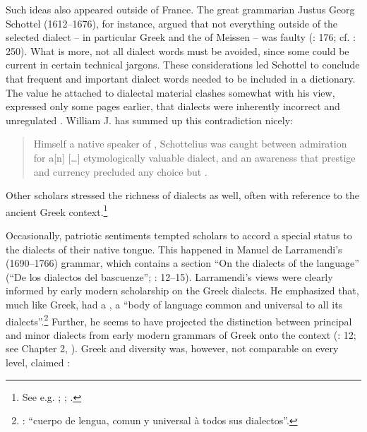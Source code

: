 Such ideas also appeared outside of France. The great  grammarian Justus Georg Schottel (1612–1676), for instance, argued that not everything outside of the selected dialect – in particular  Greek and the  of Meissen – was faulty (\citealt{Schottel1663}: 176; cf. \citealt{Roelcke2014}: 250). What is more, not all dialect words must be avoided, since some could be current in certain technical jargons. These considerations led Schottel to conclude that frequent and important dialect words needed to be included in a dictionary. The value he attached to dialectal material clashes somewhat with his view, expressed only some pages earlier, that dialects were inherently incorrect and unregulated \citep[174]{Schottel1663}. William J. \citet[1110]{Jones2001} has summed up this contradiction nicely:

\begin{quote}
Himself a native speaker of , Schottelius was caught between admiration for a[n] […] etymologically valuable dialect, and an awareness that prestige and currency precluded any choice but .
\end{quote}

Other  scholars stressed the richness of  dialects as well, often with reference to the ancient Greek context.\footnote{See e.g. \citet[\textsc{a.3}\textsc{\textsuperscript{r}}\textsc{–a.3}\textsc{\textsuperscript{v}}]{Chytraeus1582}; \citet[\textsc{c.1}\textsc{\textsuperscript{r}}]{Meisner1705}; \citet[73]{Hertling1708}.}

Occasionally, patriotic sentiments tempted scholars to accord a special status to the dialects of their native  tongue. This happened in Manuel de Larramendi’s (1690–1766)  grammar, which contains a section “On the dialects of the  language” (“De los dialectos del bascuenze”; \citealt{Larramendi1729}: 12–15). Larramendi’s views were clearly informed by early modern scholarship on the Greek dialects. He emphasized that, much like Greek,  had a , a “body of language common and universal to all its dialects”.\footnote{\citet[12--13]{Larramendi1729}: “cuerpo de lengua, comun y universal à todos sus dialectos”.} Further, he seems to have projected the distinction between principal and minor dialects from early modern grammars of Greek onto the  context (\citealt{Larramendi1729}: 12; see Chapter 2, ). Greek and  diversity was, however, not comparable on every level, claimed \citet[12]{Larramendi1729}:

